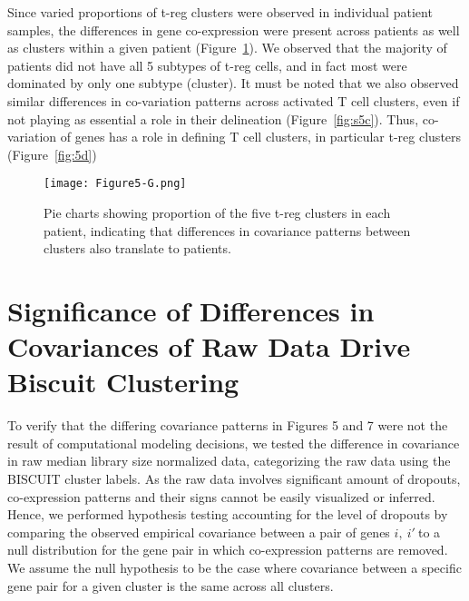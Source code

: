 Since varied proportions of t-reg clusters were observed in individual patient samples, the differences in gene co-expression were present across patients as well as clusters within a given patient (Figure~\ref{fig:5g}).
We observed that the majority of patients did not have all 5 subtypes of t-reg cells, and in fact most were dominated by only one subtype (cluster).
It must be noted that we also observed similar differences in co-variation patterns across activated T cell clusters, even if not playing as essential a role in their delineation (Figure~\ref{fig:s5c}).
Thus, co-variation of genes has a role in defining T cell clusters, in particular t-reg clusters (Figure~\ref{fig:5d})

\begin{figure}
\centering
\texttt{[image: Figure5-G.png]}
\caption{Pie charts showing proportion of the five t-reg clusters in each patient, indicating that differences in covariance patterns between clusters also translate to patients.
}
\label{fig:5g}
\end{figure}

\section{Significance of Differences in Covariances of Raw Data Drive Biscuit Clustering}

To verify that the differing covariance patterns in Figures 5 and 7 were not the result of computational modeling decisions, we tested the difference in covariance in raw median library size normalized data, categorizing the raw data using the BISCUIT cluster labels.  
As the raw data involves significant amount of dropouts, co-expression patterns and their signs cannot be easily visualized or inferred.
Hence, we performed hypothesis testing accounting for the level of dropouts by comparing the observed empirical covariance between a pair of genes \(i,\ i'\ \)to a null distribution for the gene pair in which co-expression patterns are removed.
We assume the null hypothesis to be the case where covariance between a specific gene pair for a given cluster is the same across all clusters.

